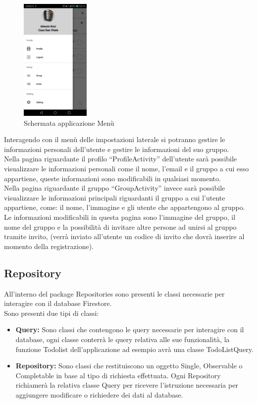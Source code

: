\begin{figure}[!hb]
  \centering
  \includegraphics[width=0.3\textwidth]{immagini/app_menu.jpg}
  \caption{Schermata applicazione Menù}\label{fig:Schermata applicazione Menu}
\end{figure}

Interagendo con il menù delle impostazioni laterale si potranno gestire le informazioni personali dell'utente e gestire le informazioni del suo gruppo.\\
Nella pagina riguardante il profilo ``ProfileActivity'' dell'utente sarà possibile visualizzare le informazioni personali come il nome, l'email e il gruppo a cui esso appartiene, queste informazioni sono modificabili in qualsiasi momento.\\
Nella pagina riguardante il gruppo ``GroupActivity'' invece sarà possibile visualizzare le informazioni principali riguardanti il gruppo a cui l'utente appartiene, come: il nome, l'immagine e gli utente che appartengono al gruppo. Le informazioni modificabili in questa pagina sono l'immagine del gruppo, il nome del gruppo e la possibilità di invitare altre persone ad unirsi al gruppo tramite invito, (verrà inviato all'utente un codice di invito che dovrà inserire al momento della registrazione).\\



\subsection{Repository}
All'interno del package Repositories sono presenti le classi necessarie per interagire con il database Firestore.\\
Sono presenti due tipi di classi:
\begin{itemize}
    \item \textbf{Query:} Sono classi che contengono le query necessarie per interagire con il database, ogni classe conterrà le query relativa alle sue funzionalità, la funzione Todolist dell'applicazione ad esempio avrà una classe TodoListQuery.
    \item \textbf{Repository:} Sono classi che restituiscono un oggetto Single, Observable o Completable in base al tipo di richiesta effettuata. Ogni Repository richiamerà la relativa classe Query per ricevere l'istruzione necessaria per aggiungere modificare o richiedere dei dati al database.
\end{itemize}

